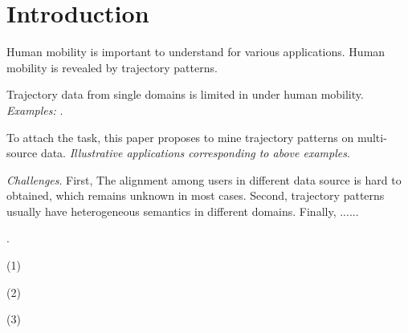 \section{Introduction}
\label{sec-intro}

Human mobility is important to understand for various applications. Human mobility is revealed by trajectory patterns.

Trajectory data from single domains is limited in under human mobility. {\em Examples: }.
%

To attach the task, this paper proposes to mine trajectory patterns on multi-source data.  {\em Illustrative applications corresponding to above examples}.

{\em Challenges}.
First, The alignment among users in different data source is hard to obtained, which remains unknown in most cases.
%
Second, trajectory patterns usually have heterogeneous semantics in different domains.
%
Finally, ......

.

\ni (1)

\ni (2)

\ni (3)